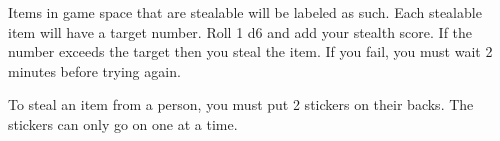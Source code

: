 \documentclass[green]{LRSguildcamp1}
\begin{document}
\name{\gTest{}}

Items in game space that are stealable will be labeled as such. Each stealable item will have a target number. Roll 1 d6 and add your stealth score.  If the number exceeds the target then you steal the item. If you fail, you must wait 2 minutes before trying again.

To steal an item from a person, you must put 2 stickers on their backs. The stickers can only go on one at a time. 
\end{document}
